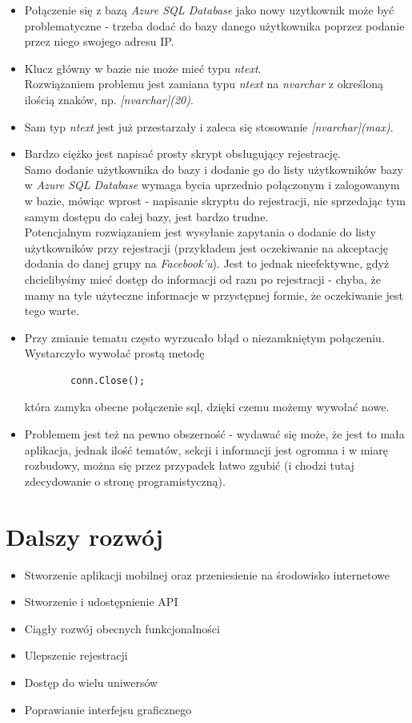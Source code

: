 \documentclass{article}
\begin{document}
\begin{itemize}
    \item Połączenie się z bazą \textit{Azure SQL Database} jako nowy uzytkownik może być problematyczne - trzeba dodać do bazy danego użytkownika poprzez podanie przez niego swojego adresu IP.
    \item Klucz główny w bazie nie może mieć typu \textit{ntext}.
    \\Rozwiązaniem problemu jest zamiana typu \textit{ntext} na \textit{nvarchar} z określoną ilością znaków, np. \textit{[nvarchar](20)}.
    \item Sam typ \textit{ntext} jest już przestarzały i zaleca się stosowanie \textit{[nvarchar](max)}.
    \item Bardzo ciężko jest napisać prosty skrypt obsługujący rejestrację.
    \\Samo dodanie użytkownika do bazy i dodanie go do listy użytkowników bazy w \textit{Azure SQL Database} wymaga bycia uprzednio połączonym i zalogowanym w bazie, mówiąc wprost - napisanie skryptu do rejestracji, nie sprzedając tym samym dostępu do całej bazy, jest bardzo trudne.
    \\Potencjalnym rozwiązaniem jest wysyłanie zapytania o dodanie do listy użytkowników przy rejestracji (przykładem jest oczekiwanie na akceptację dodania do danej grupy na \textit{Facebook'u}). Jest to jednak nieefektywne, gdyż chcielibyśmy mieć dostęp do informacji od razu po rejestracji - chyba, że mamy na tyle użyteczne informacje w przystępnej formie, że oczekiwanie jest tego warte.
    \item Przy zmianie tematu często wyrzucało błąd o niezamkniętym połączeniu.
    \\Wystarczyło wywołać prostą metodę
    \begin{verbatim}
        conn.Close();
    \end{verbatim}
    która zamyka obecne połączenie sql, dzięki czemu możemy wywołać nowe.
    \item Problemem jest też na pewno obszerność - wydawać się może, że jest to mała aplikacja, jednak ilość tematów, sekcji i informacji jest ogromna i w miarę rozbudowy, można się przez przypadek łatwo zgubić (i chodzi tutaj zdecydowanie o stronę programistyczną).
\end{itemize}
\newpage
\section{Dalszy rozwój}
\begin{itemize}
    \item Stworzenie aplikacji mobilnej oraz przeniesienie na środowisko internetowe
    \item Stworzenie i udostępnienie API
    \item Ciągły rozwój obecnych funkcjonalności
    \item Ulepszenie rejestracji
    \item Dostęp do wielu uniwersów 
    \item Poprawianie interfejsu graficznego
\end{itemize}
\end{document}
